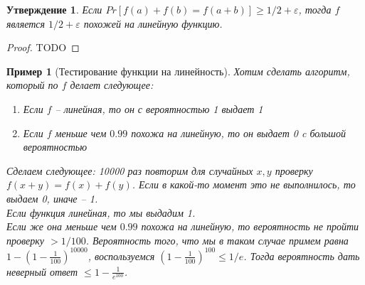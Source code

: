 \documentclass[12pt, letterpaper]{article}
\newtheorem{prop}{Утверждение}[section]
\newtheorem{sample}{Пример}[section]
\newcommand{\e}{\varepsilon}
\begin{document}
\begin{prop}
Если $Pr[f(a) + f(b) = f(a+b)] \geq 1/2 + \e$, тогда $f$ является $1/2+\e$ похожей на линейную функцию.
\end{prop}
\begin{proof}
TODO
\end{proof}

\begin{sample}[Тестирование функции на линейность]
Хотим сделать алгоритм, который по $f$ делает следующее:
\begin{enumerate}
\item Если $f$ -- линейная, то он с вероятностью 1 выдает 1
\item Если $f$ меньше чем $0.99$ похожа на линейную, то он выдает 0 c большой вероятностью
\end{enumerate}
Сделаем следующее: 10000 раз повторим для случайных $x,y$ проверку $f(x+y) = f(x) +f(y)$. Если 
в какой-то момент это не выполнилось, то выдаем 0, иначе -- 1.\\
Если функция линейная, то мы выдадим 1.\\
Если же она меньше чем $0.99$ похожа на линейную, то вероятность не пройти проверку $>1/100$. Вероятность того, что мы в таком случае примем равна $1-(1-\frac{1}{100})^{10000}$, воспользуемся $(1 - \frac{1}{100})^{100} \leq 1/e$. Тогда вероятность дать неверный ответ $\leq 1 - \frac{1}{e^{100}}$.
\end{sample}
\end{document}
